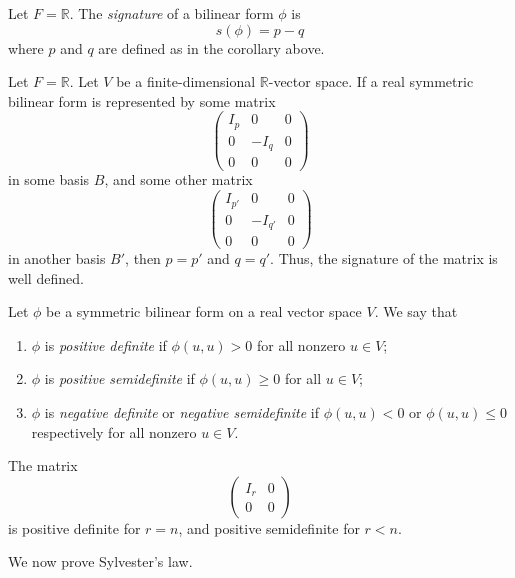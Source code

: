 \begin{definition}
	Let \( F = \mathbb R \).
	The \textit{signature} of a bilinear form \( \phi \) is
	\[
		s(\phi) = p - q
	\]
	where \( p \) and \( q \) are defined as in the corollary above.
\end{definition}
\begin{theorem}
	Let \( F = \mathbb R \).
	Let \( V \) be a finite-dimensional \( \mathbb R \)-vector space.
	If a real symmetric bilinear form is represented by some matrix
	\[
		\begin{pmatrix}
			I_p & 0    & 0 \\
			0   & -I_q & 0 \\
			0   & 0    & 0
		\end{pmatrix}
	\]
	in some basis \( B \), and some other matrix
	\[
		\begin{pmatrix}
			I_{p'} & 0       & 0 \\
			0      & -I_{q'} & 0 \\
			0      & 0       & 0
		\end{pmatrix}
	\]
	in another basis \( B' \), then \( p = p' \) and \( q = q' \).
	Thus, the signature of the matrix is well defined.
\end{theorem}
\begin{definition}
	Let \( \phi \) be a symmetric bilinear form on a real vector space \( V \).
	We say that
	\begin{enumerate}
		\item \( \phi \) is \textit{positive definite} if \( \phi(u,u) > 0 \) for all nonzero \( u \in V \);
		\item \( \phi \) is \textit{positive semidefinite} if \( \phi(u,u) \geq 0 \) for all \( u \in V \);
		\item \( \phi \) is \textit{negative definite} or \textit{negative semidefinite} if \( \phi(u,u) < 0 \) or \( \phi(u,u) \leq 0 \) respectively for all nonzero \( u \in V \).
	\end{enumerate}
\end{definition}
\begin{example}
	The matrix
	\[
		\begin{pmatrix}
			I_r & 0 \\
			0   & 0
		\end{pmatrix}
	\]
	is positive definite for \( r = n \), and positive semidefinite for \( r < n \).
\end{example}
\noindent We now prove Sylvester's law.

